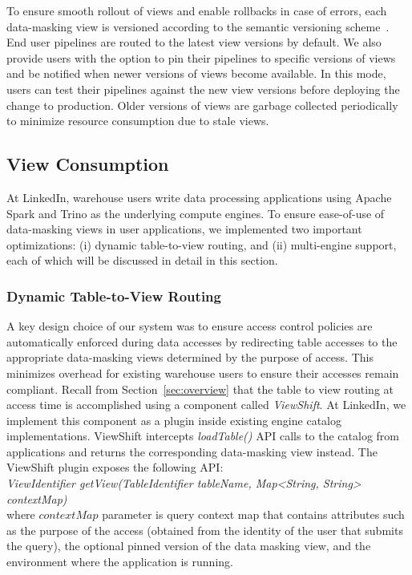 To ensure smooth rollout of views and enable rollbacks in case of errors, each data-masking view is versioned according to the semantic versioning scheme~\cite{semver}. 
End user pipelines are routed to the latest view versions by default. 
We also provide users with the option to pin their pipelines to specific versions of views and be notified when newer versions of views become available. 
In this mode, users can test their pipelines against the new view versions before deploying the change to production. 
Older versions of views are garbage collected periodically to minimize resource consumption due to stale views. 

\subsection{View Consumption}
At LinkedIn, warehouse users write data processing applications using Apache Spark and Trino as the underlying compute engines. To ensure ease-of-use of data-masking views in user applications, we implemented two important optimizations: (i) dynamic table-to-view routing, and (ii) multi-engine support, each of which will be discussed in detail in this section.

\subsubsection{Dynamic Table-to-View Routing}
A key design choice of our system was to ensure access control policies are automatically enforced during data accesses by redirecting table accesses to the appropriate data-masking views determined by the purpose of access. 
This minimizes overhead for existing warehouse users to ensure their accesses remain compliant. 
Recall from Section~\ref{sec:overview} that the table to view routing at access time is accomplished using a component called {\em ViewShift}. 
At LinkedIn, we implement this component as a plugin inside existing engine catalog implementations. 
ViewShift intercepts \emph{loadTable()} API calls to the catalog from applications and returns the corresponding data-masking view instead. The ViewShift plugin exposes the following API: \\
\emph{ViewIdentifier getView(TableIdentifier tableName, Map\textless{}String, String\textgreater{} contextMap)}\ \\
where $contextMap$ parameter is query context map that contains attributes such as the purpose of the access (obtained from the identity of the user that submits the query), the optional pinned version of the data masking view, and the environment where the application is running. 

